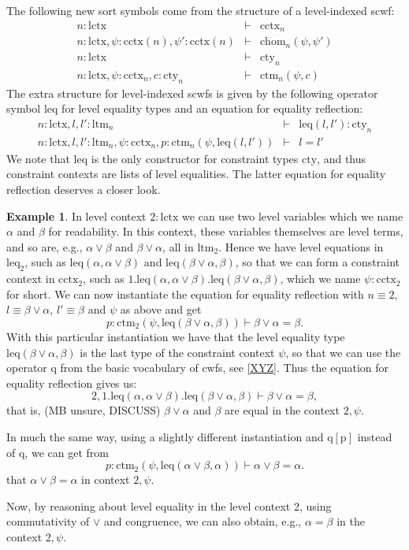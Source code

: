 \documentclass[11pt,a4paper]{article}
\theoremstyle{definition}
\newtheorem{example}{Example}
\def\lctx{\mathrm{lctx}}
\def\ltm{\mathrm{ltm}}
\def\leq{\mathrm{leq}}
\def\cctx{\mathrm{cctx}}
\def\cty{\mathrm{cty}}
\def\ctm{\mathrm{ctm}}
\def\chom{\mathrm{chom}}
\def\p{\mathrm{p}}
\def\q{\mathrm{q}}
\begin{document}
The following new sort symbols come from the structure of a level-indexed scwf:
\begin{eqnarray*}
n : \lctx &\vdash& \cctx_n\\
n : \lctx, \psi : \cctx(n), \psi' : \cctx(n) &\vdash& \chom_n(\psi,\psi')\\
n : \lctx &\vdash& \cty_n\\
n : \lctx, \psi : \cctx_n, c : \cty_n &\vdash& \ctm_n(\psi,c)
\end{eqnarray*}
The extra structure for level-indexed scwfs is given by the following operator symbol $\leq$ for level equality types and an equation for equality reflection:
\begin{eqnarray*}
n : \lctx, l, l' : \ltm_n &\vdash& \leq(l,l') : \cty_n\\
n : \lctx, l, l' : \ltm_n, \psi : \cctx_n, p : \ctm_n(\psi,\leq(l,l')) &\vdash& l = l'
\end{eqnarray*}
We note that $\leq$ is the only constructor for constraint types $\cty$, 
and thus constraint contexts are lists of level equalities.
The latter equation for equality reflection deserves a closer look.

\begin{example}\label{exa:cctx-entails-lattice-eqs}
In level context $2:\lctx$ we can use two level variables which we 
name $\alpha$ and $\beta$ for readability. 
In this context, these variables themselves are level terms, and so are, 
e.g., $\alpha\vee\beta$ and $\beta\vee\alpha$, all in $\ltm_2$.
Hence we have level equations in $\leq_2$, such as
$\leq(\alpha,\alpha\vee\beta)$ and $\leq(\beta\vee\alpha,\beta)$,
so that we can form a constraint context in $\cctx_2$, such as 
$1.\leq(\alpha,\alpha\vee\beta).\leq(\beta\vee\alpha,\beta)$,
which we name $\psi: \cctx_2$ for short.
We can now instantiate the equation for equality reflection
with $n\equiv 2$, $l\equiv \beta\vee\alpha$, $l'\equiv \beta$ and $\psi$
as above and get 
\[
p : \ctm_2(\psi,\leq(\beta\vee\alpha,\beta))\vdash \beta\vee\alpha = \beta.
\]
With this particular instantiation we have that the
level equality type $\leq(\beta\vee\alpha,\beta)$ is the last type
of the constraint context $\psi$, so that we can use the operator $\q$ 
from the basic vocabulary of cwfs, see \ref{XYZ}.
Thus the equation for equality reflection gives us:
\[
2,1.\leq(\alpha,\alpha\vee\beta).\leq(\beta\vee\alpha,\beta)
\vdash \beta\vee\alpha = \beta,
\]
that is, (MB unsure, DISCUSS) $\beta\vee\alpha$ and $\beta$ are equal
in the context $2,\psi$.

In much the same way, using a slightly different instantiation
and $\q[\p]$ instead of $\q$, we can get from
\[
p : \ctm_2(\psi,\leq(\alpha\vee\beta,\alpha))\vdash \alpha\vee\beta=\alpha.
\]
that $\alpha\vee\beta=\alpha$ in context $2,\psi$.

Now, by reasoning about level equality in the level context 2,
using commutativity of $\vee$ and congruence,
we can also obtain, e.g., $\alpha =\beta$ in the context $2,\psi$.
\end{example}
\end{document}
